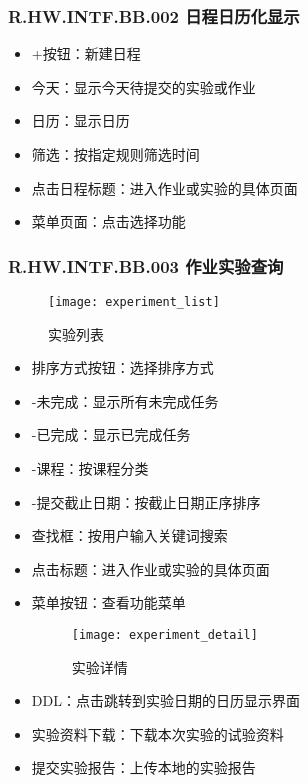     \subsubsection{R.HW.INTF.BB.002 日程日历化显示}
    \begin{figure}[H]
    \centering
    \caption{}
    \end{figure}
    \begin{itemize}
      \item +按钮：新建日程
      \item 今天：显示今天待提交的实验或作业
      \item 日历：显示日历
      \item 筛选：按指定规则筛选时间
      \item 点击日程标题：进入作业或实验的具体页面
      \item 菜单页面：点击选择功能
    \end{itemize}
    \subsubsection{R.HW.INTF.BB.003 作业实验查询}
    \begin{figure}[H]
    \centering
    \texttt{[image: experiment\_list]}
    \caption{实验列表}
    \end{figure}
    \begin{itemize}
  \item  排序方式按钮：选择排序方式
  \item -未完成：显示所有未完成任务
  \item -已完成：显示已完成任务
  \item -课程：按课程分类
  \item -提交截止日期：按截止日期正序排序
  \item 查找框：按用户输入关键词搜索
  \item 点击标题：进入作业或实验的具体页面
  \item 菜单按钮：查看功能菜单
  \begin{figure}[H]
  \centering
  \texttt{[image: experiment\_detail]}
  \caption{实验详情}
  \end{figure}
  \item DDL：点击跳转到实验日期的日历显示界面
  \item 实验资料下载：下载本次实验的试验资料
  \item 提交实验报告：上传本地的实验报告
  \end{itemize}
